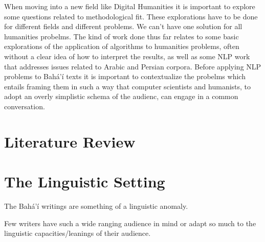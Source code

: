 \documentclass[12pt, oneside]{report}
\begin{document}
When moving into a new field like Digital Humanities it is important to explore some questions related to methodological fit. These explorations have to be done for different fields and different problems. We can't have one solution for all humanities probelms. The kind of work done thus far relates to some basic explorations of the application of algorithms to humanities problems, often without a clear idea of how to interpret the results, as well as some NLP work that addresses issues related to Arabic and Persian corpora. Before applying NLP problems to Bahá'í texts it is important to contextualize the probelms which entails framing them in such a way that computer scientists and humanists, to adopt an overly simplistic schema of the audienc, can engage in a common conversation.
\chapter{Literature Review}

\chapter{The Linguistic Setting}
\par

\par
The Bah\'{a}'\'{i} writings are something of a linguistic anomaly.
\par
Few writers have such a wide ranging audience in mind or adapt so much to the linguistic capacities/leanings of their audience.
\end{document}
